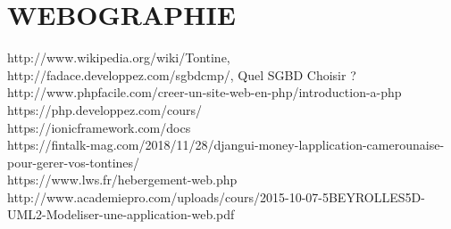 \chapter*{WEBOGRAPHIE}

http://www.wikipedia.org/wiki/Tontine,\\
http://fadace.developpez.com/sgbdcmp/, Quel SGBD Choisir ? \\	 
http://www.phpfacile.com/creer-un-site-web-en-php/introduction-a-php \\ 	
https://php.developpez.com/cours/ \\			
https://ionicframework.com/docs \\				
https://fintalk-mag.com/2018/11/28/djangui-money-lapplication-camerounaise-pour-gerer-vos-tontines/ \\					
https://www.lws.fr/hebergement-web.php \\						
http://www.academiepro.com/uploads/cours/2015-10-07-5BEYROLLES5D-UML2-Modeliser-une-application-web.pdf \\
